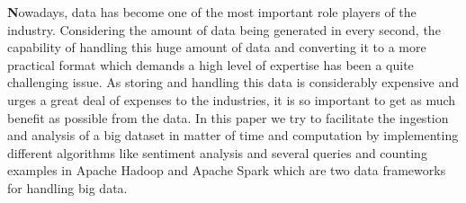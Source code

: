 \textbf
Nowadays, data has become one of the most important role players of the industry. Considering the amount of data being generated in every second, the capability of handling this huge amount of data and converting it to a more practical format which demands a high level of expertise has been a quite challenging issue. As storing and handling this data is considerably expensive and urges a great deal of expenses to the industries, it is so important to get as much benefit as possible from the data. In this paper we try to facilitate the ingestion and analysis of a big dataset in matter of time and computation by implementing different algorithms like sentiment analysis and several queries and counting examples in Apache Hadoop and Apache Spark which are two data frameworks for handling big data.
